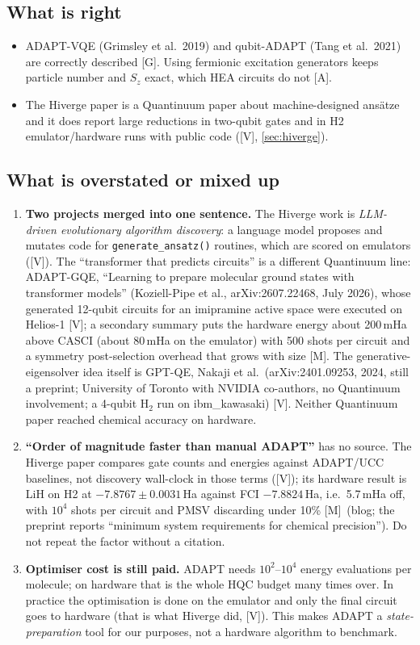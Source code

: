 \documentclass[11pt,a4paper]{article}
\newcommand{\lV}{\textcolor{keyblue}{[V]}}   %
\newcommand{\lA}{\textcolor{notegray}{[A]}}  %
\newcommand{\lG}{\textcolor{alertred}{[G]}}  %
\newcommand{\lM}{\textcolor{alertred}{[M]}}  %
\begin{document}
\subsection{What is right}
\begin{itemize}
\item ADAPT-VQE (Grimsley et al.\ 2019) and qubit-ADAPT (Tang et al.\ 2021) are correctly described \lG. Using fermionic excitation generators keeps particle number and $S_z$ exact, which HEA circuits do not \lA.
\item The Hiverge paper is a Quantinuum paper about machine-designed ans\"atze and it does report large reductions in two-qubit gates and in H2 emulator/hardware runs with public code (\lV, \cref{sec:hiverge}).
\end{itemize}

\subsection{What is overstated or mixed up}
\begin{enumerate}
\item \textbf{Two projects merged into one sentence.} The Hiverge work is \emph{LLM-driven evolutionary algorithm discovery}: a language model proposes and mutates code for \texttt{generate\_ansatz()} routines, which are scored on emulators (\lV). The ``transformer that predicts circuits'' is a different Quantinuum line: ADAPT-GQE, ``Learning to prepare molecular ground states with transformer models'' (Koziell-Pipe et al., arXiv:2607.22468, July 2026), whose generated 12-qubit circuits for an imipramine active space were executed on Helios-1 \lV; a secondary summary puts the hardware energy about 200\,mHa above CASCI (about 80\,mHa on the emulator) with 500 shots per circuit and a symmetry post-selection overhead that grows with size \lM. The generative-eigensolver idea itself is GPT-QE, Nakaji et al.\ (arXiv:2401.09253, 2024, still a preprint; University of Toronto with NVIDIA co-authors, no Quantinuum involvement; a 4-qubit H$_2$ run on ibm\_kawasaki) \lV. Neither Quantinuum paper reached chemical accuracy on hardware.
\item \textbf{``Order of magnitude faster than manual ADAPT''} has no source. The Hiverge paper compares gate counts and energies against ADAPT/UCC baselines, not discovery wall-clock in those terms (\lV); its hardware result is LiH on H2 at $-7.8767\pm0.0031$\,Ha against FCI $-7.8824$\,Ha, i.e.\ 5.7\,mHa off, with $10^4$ shots per circuit and PMSV discarding under 10\% \lM\ (blog; the preprint reports ``minimum system requirements for chemical precision''). Do not repeat the factor without a citation.
\item \textbf{Optimiser cost is still paid.} ADAPT needs $10^2$--$10^4$ energy evaluations per molecule; on hardware that is the whole HQC budget many times over. In practice the optimisation is done on the emulator and only the final circuit goes to hardware (that is what Hiverge did, \lV). This makes ADAPT a \emph{state-preparation} tool for our purposes, not a hardware algorithm to benchmark.
\end{enumerate}
\end{document}
